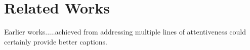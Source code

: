 \chapter{Related Works}
Earlier works.....achieved from addressing multiple lines of attentiveness could certainly provide better captions.